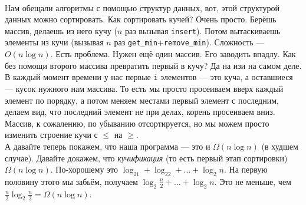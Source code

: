 \documentclass{article}
\newcommand{\pseudo}{PseudoLexer.py:PseudoLexer -x}
\newcommand{\pseudocode}[1]{\texttt{#1}}
\begin{document}
    \\
    Нам обещали алгоритмы с помощью структур данных, вот, этой структурой данных можно сортировать. Как сортировать кучей? Очень просто. Берёшь массив, делаешь из него кучу ($n$ раз вызывая \pseudocode{insert}). Потом вытаскиваешь элементы из кучи (вызывая $n$ раз \pseudocode{get_min}+\pseudocode{remove_min}). Сложность --- $O(n\log n)$. Есть проблема. Нужен ещё один массив. Его заводить впадлу. Как без помощи второго массива превратить первый в кучу? Да на изи на самом деле. В каждый момент времени у нас первые \pseudocode{i} элементов --- это куча, а оставшиеся --- кусок нужного нам массива. То есть мы просто просеиваем вверх каждый элемент по порядку, а потом меняем местами первый элемент с последним, делаем вид, что последний элемент не при делах, корень просеиваем вниз. Массив, к сожалению, по убыванию отсортируется, но мы можем просто изменить строение кучи с $\leqslant$ на $\geqslant$.\\
    А давайте теперь покажем, что наша программа --- это и $\varOmega(n\log n)$ (в худшем случае). Давайте докажем, что \textit{кучификация} (то есть первый этап сортировки) $\varOmega(n\log n)$. По-хорошему это $\log_21+\log_22+\ldots+\log_2n$. На первую половину этого мы забьём, получаем $\log_2\frac n2+\ldots+\log_2n$. Это не меньше, чем $\frac n2\log_2\frac n2=\varOmega(n\log n)$.\\
\end{document}
